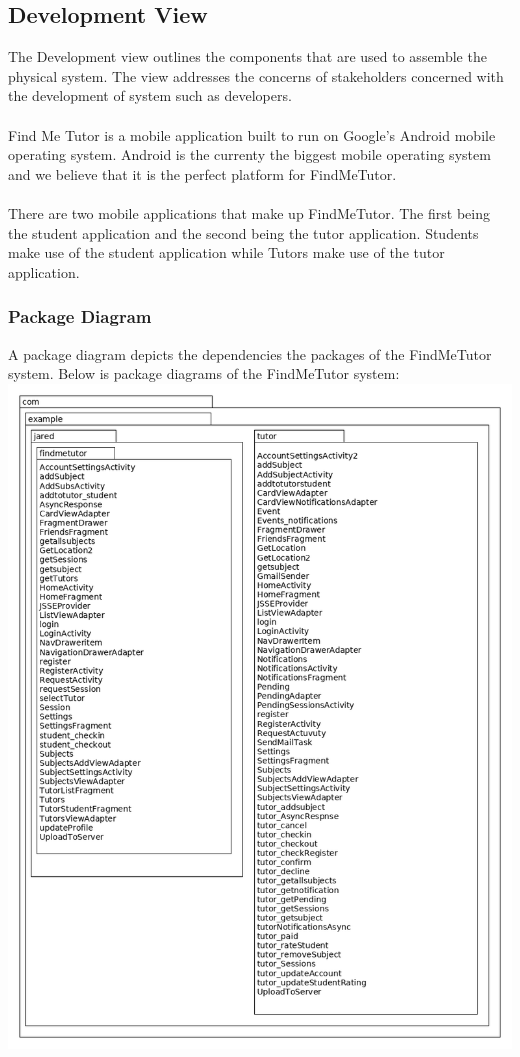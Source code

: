 \documentclass[12pt]{article}
\begin{document}
\subsection{Development View}
The Development view outlines the components that are used to assemble the physical system.
The view addresses the concerns of stakeholders concerned with the development of system such as developers.\\
\\
Find Me Tutor is a mobile application built to run on Google's Android mobile operating system. Android is the currenty the biggest mobile operating system and we believe that it is the perfect platform for FindMeTutor.\\\\
There are two mobile applications that make up FindMeTutor. The first being the student application and the second being the tutor application. Students make use of the student application while Tutors make use of the tutor application.\\
\subsubsection{Package Diagram}

A package diagram depicts the dependencies the packages of the FindMeTutor system.
Below is package diagrams of the FindMeTutor system:\\
\includegraphics[width=140mm]{./package_diagram/package_diagram.png}
\end{document}
